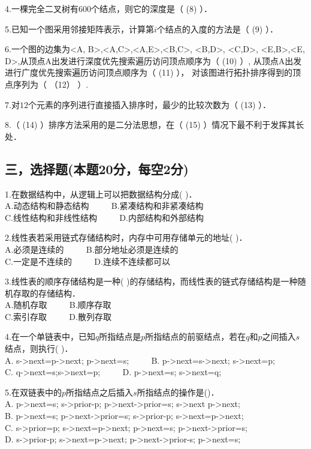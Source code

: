4.一棵完全二叉树有$600$个结点，则它的深度是（ (8) ）．

5.已知一个图采用邻接矩阵表示，计算第$i$个结点的入度的方法是（ (9) ）．

6.一个图的边集为{<A, B>,<A,C>,<A,E>,<B,C>, <B,D>, <C,D>, <E,B>,<E, D>},从顶点A出发进行深度优先搜索遍历访问顶点顺序为（ (10) ）, 从顶点A出发进行广度优先搜索遍历访问顶点顺序为（ (11) ）， 对该图进行拓扑排序得到的顶点序列为（ （12） ）.

7.对$12$个元素的序列进行直接插入排序时，最少的比较次数为（ (13) ）．

8.（ (14) ）排序方法采用的是二分法思想，在（ (15) ）情况下最不利于发挥其长处．

\subsection{三，选择题(本题20分，每空2分)}

1.在数据结构中，从逻辑上可以把数据结构分成( )． \\
A.动态结构和静态结构 $\qquad$ B.紧凑结构和非紧凑结构 \\
C.线性结构和非线性结构 $\qquad$ D.内部结构和外部结构

2.线性表若采用链式存储结构时，内存中可用存储单元的地址( )． \\
A.必须是连续的 $\qquad$ B.部分地址必须是连续的 \\
C.一定是不连续的 $\qquad$ D.连续不连续都可以

3.线性表的顺序存储结构是一种(  )的存储结构，而线性表的链式存储结构是一种随机存取的存储结构． \\
A.随机存取 $\qquad$ B.顺序存取 \\
C.索引存取 $\qquad$ D.散列存取

4.在一个单链表中，已知$q$所指结点是$p$所指结点的前驱结点，若在$q$和$p$之间插入$s$结点，则执行( )． \\
A. s->next=p->next; p->next=s; $\qquad$ B. p->next=s->next; s->next=p; \\
C. q->next=s;s->next=p; $\qquad$ D. p->next=s; s->next=q;

5.在双链表中的$p$所指结点之后插入$s$所指结点的操作是()． \\
A. p->next=s; s->prior-p; p->next->prior=s; s->next p->next; \\
B. p->next=s; p->next->prior=s; s->prior-p; s->next=p->next; \\
C. s->prior=p; s->next=p->next; p->next=s; p->next->prior=s; \\
D. s->prior-p; s->next=p->next; p->next->prior-s; p->next=s;

